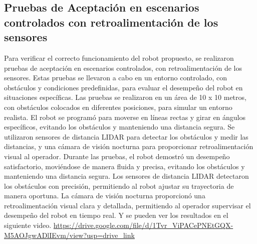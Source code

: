 \subsection{Pruebas de Aceptaci\'on en escenarios controlados con retroalimentaci\'on de los sensores} %
\label{sub:Pruebas de Aceptaci\'on en escenarios controlados con retroalimentaci\'on de los sensores}
    Para verificar el correcto funcionamiento del robot propuesto, se realizaron pruebas de aceptaci\'on en escenarios controlados, 
        con retroalimentaci\'on de los sensores. Estas pruebas se llevaron a cabo en un entorno controlado, con obst\'aculos 
        y condiciones predefinidas, para evaluar el desempe\~no del robot en situaciones espec\'ificas. 
    \vskip 0.5cm
    Las pruebas se realizaron en un \'area de 10 x 10 metros, con obst\'aculos colocados en diferentes posiciones, 
        para simular un entorno realista. El robot se program\'o para moverse en l\'ineas rectas y girar en \'angulos 
        espec\'ificos, evitando los obst\'aculos y manteniendo una distancia segura. Se utilizaron sensores de distancia 
        LIDAR para detectar los obst\'aculos y medir las distancias, y una c\'amara de visi\'on nocturna para 
        proporcionar retroalimentaci\'on visual al operador.
    \vskip 0.5cm
    Durante las pruebas, el robot demostr\'o un desempe\~no satisfactorio, movi\'endose de manera fluida y precisa, 
        evitando los obst\'aculos y manteniendo una distancia segura. Los sensores de distancia LIDAR detectaron
        los obst\'aculos con precisi\'on, permitiendo al robot ajustar su trayectoria de manera oportuna. La c\'amara
        de visi\'on nocturna proporcion\'o una retroalimentaci\'on visual clara y detallada, permitiendo al operador
        supervisar el desempe\~no del robot en tiempo real. Y se pueden ver los resultados en el siguiente video.
    \vskip 0.5cm
    \url{https://drive.google.com/file/d/1Tvr_ViPACePNEtGQX-M5AOJgwADlIEvm/view?usp=drive_link}
